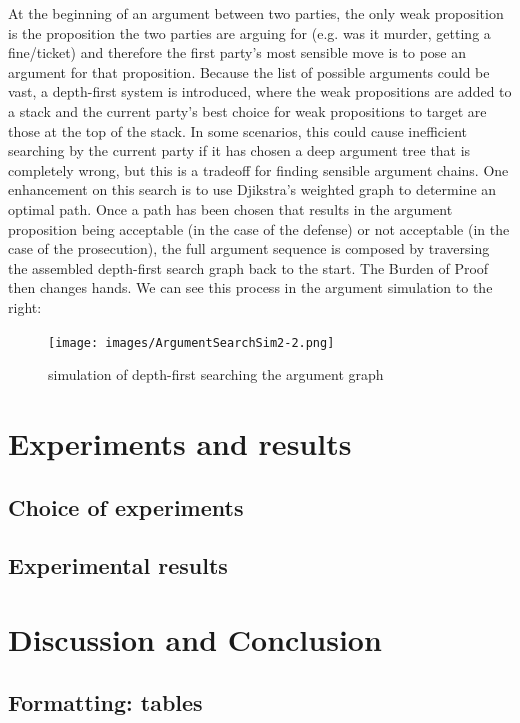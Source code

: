 \documentclass[10pt,a4paper,twocolumn]{article}
\begin{document}
At the beginning of an argument between two parties, the only weak
proposition is the proposition the two parties are arguing for (e.g. was it murder,
getting a fine/ticket) and therefore the first party's most sensible move is to
pose an argument for that proposition. Because the list of possible arguments
could be vast, a depth-first system is introduced, where the weak propositions
are added to a stack and the current party's best choice for weak propositions
to target are those at the top of the stack. In some scenarios, this could cause
inefficient searching by the current party if it has chosen a deep argument tree
that is completely wrong, but this is a tradeoff for finding sensible argument
chains. One enhancement on this search is to use Djikstra's weighted graph to
determine an optimal path. Once a path has been chosen that results in the
argument proposition being acceptable (in the case of the defense) or not
acceptable (in the case of the prosecution), the full argument sequence is
composed by traversing the assembled depth-first search graph back to the start.
The Burden of Proof then changes hands. We can see this process in the argument
simulation to the right:

\begin{figure}[h!]
	\texttt{[image: images/ArgumentSearchSim2-2.png]}
	\centering
	\caption{simulation of depth-first searching the argument graph}
\end{figure}

\section{Experiments and results}

\subsection{Choice of experiments}

\subsection{Experimental results}

\section{Discussion and Conclusion}

\subsection{Formatting: tables}
\end{document}
